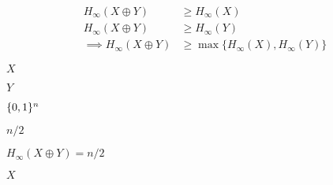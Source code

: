 \documentclass[10pt]{book}
\begin{document}
\begin{mdSnippets}
\begin{mdDisplaySnippet}[e9737aced98832e6c26a57e3433c0120]
\[\begin{aligned}
H_{\infty}(X \oplus Y) &\geq H_{\infty}(X) \\
H_{\infty}(X \oplus Y) &\geq H_{\infty}(Y) \\
\implies H_{\infty}(X \oplus Y) &\geq \max \{ H_{\infty}(X), H_{\infty}(Y)\}
\end{aligned}
\]%
\end{mdDisplaySnippet}%
\begin{mdInlineSnippet}[02129bb861061d1a052c592e2dc6b383]%
$X$\end{mdInlineSnippet}%
\begin{mdInlineSnippet}[57cec4137b614c87cb4e24a3d003a3e0]%
$Y$\end{mdInlineSnippet}%
\begin{mdInlineSnippet}[5867c9b098884eca2779f6d98d4b0b29]%
$\{0,1\}^n$\end{mdInlineSnippet}%
\begin{mdInlineSnippet}%
$n/2$\end{mdInlineSnippet}%
\begin{mdInlineSnippet}[392ce181b291eb3560dc0b5c84475f41]%
$H_{\infty}(X\oplus Y)=n/2$\end{mdInlineSnippet}%
\begin{mdInlineSnippet}[02129bb861061d1a052c592e2dc6b383]%
$X$\end{mdInlineSnippet}%

\end{mdSnippets}
\end{document}
